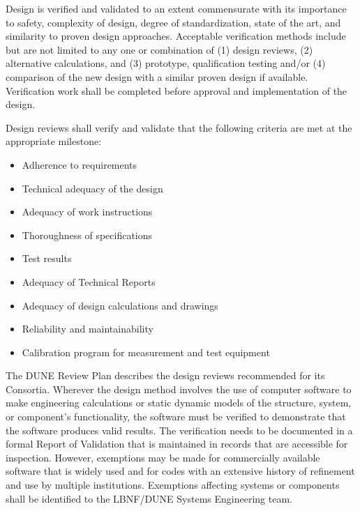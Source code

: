 Design is verified and validated to an extent commensurate with its
importance to safety, complexity of design, degree of standardization,
state of the art, and similarity to proven design
approaches. Acceptable verification methods include but are not
limited to any one or combination of (1) design reviews, (2)
alternative calculations, and (3) prototype, qualification testing
and/or (4) comparison of the new design with a similar proven design
if available. Verification work shall be completed before approval and
implementation of the design.

Design reviews shall verify and validate that the following criteria
are met at the appropriate milestone:
\begin{itemize}
 \item Adherence to requirements
 \item Technical adequacy of the design
 \item Adequacy of work instructions
 \item Thoroughness of specifications
 \item Test results
 \item Adequacy of Technical Reports
 \item Adequacy of design calculations and drawings
 \item Reliability and maintainability
 \item Calibration program for measurement and test equipment
\end{itemize}

The DUNE Review Plan describes the design reviews recommended for its
Consortia.  Wherever the design method involves the use of computer
software to make engineering calculations or static dynamic models of
the structure, system, or component's functionality, the software must
be verified to demonstrate that the software produces valid
results. The verification needs to be documented in a formal Report of
Validation that is maintained in records that are accessible for
inspection. However, exemptions may be made for commercially available
software that is widely used and for codes with an extensive history
of refinement and use by multiple institutions. Exemptions affecting
systems or components shall be identified to the LBNF/DUNE Systems
Engineering team.

